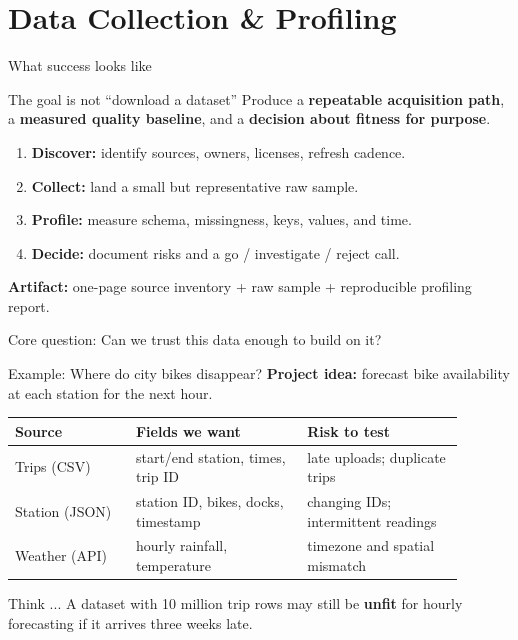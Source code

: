 \documentclass[aspectratio=43,10pt]{beamer}
\begin{document}
\section{Data Collection \& Profiling}

\begin{frame}{What success looks like}
\begin{block}{The goal is not ``download a dataset''}
Produce a \textbf{repeatable acquisition path}, a \textbf{measured quality baseline}, and a \textbf{decision about fitness for purpose}.
\end{block}

\vspace{0.3em}
\begin{enumerate}
  \item \textbf{Discover:} identify sources, owners, licenses, refresh cadence.
  \item \textbf{Collect:} land a small but representative raw sample.
  \item \textbf{Profile:} measure schema, missingness, keys, values, and time.
  \item \textbf{Decide:} document risks and a go / investigate / reject call.
\end{enumerate}

\vspace{0.5em}
\textbf{Artifact:} one-page source inventory + raw sample + reproducible profiling report.

\begin{center}\alert{Core question:} Can we trust this data enough to build on it?\end{center}
\end{frame}

\begin{frame}{Example: Where do city bikes disappear?}
\textbf{Project idea:} forecast bike availability at each station for the next hour.

\medskip
\begin{tabular}{p{0.24\linewidth}p{0.34\linewidth}p{0.31\linewidth}}
\toprule
\textbf{Source} & \textbf{Fields we want} & \textbf{Risk to test}\\
\midrule
Trips (CSV) & start/end station, times, trip ID & late uploads; duplicate trips\\
Station (JSON) & station ID, bikes, docks, timestamp & changing IDs; intermittent readings\\
Weather (API) & hourly rainfall, temperature & timezone and spatial mismatch\\
\bottomrule
\end{tabular}

\vspace{0.8em}
\begin{block}{Think ...}
A dataset with 10 million trip rows may still be \textbf{unfit} for hourly forecasting if it arrives three weeks late.
\end{block}
\end{frame}
\end{document}

